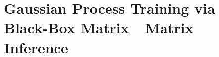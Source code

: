 \chapter{Gaussian Process Training via Black-Box Matrix~\texttimes~Matrix Inference}
\label{chapter:bbmm}








%

%

%

%
